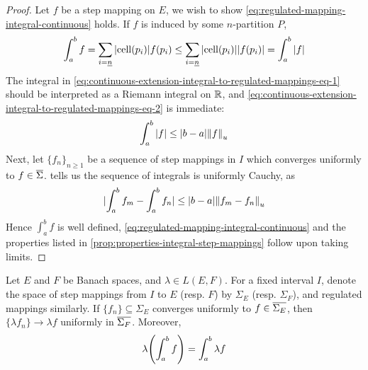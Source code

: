 \documentclass[../main-v2-manifolds.tex]{subfiles}
\begin{document}
\begin{proof}
    Let $f$ be a step mapping on $E$, we wish to show \cref{eq:regulated-mapping-integral-continuous} holds. If $f$ is induced by some $n$-partition $P$, 
    \begin{equation}\label{eq:continuous-extension-integral-to-regulated-mappings-eq-1}
    \int_a^b f = \sum_{i=\underline{n}}\vert {\operatorname{cell}(p_i)} \vert f(p_i)\leq \sum_{i=\underline{n}}\vert {\operatorname{cell}(p_i)} \vert\vert {f(p_i)} \vert = \int_a^b\vert f\vert 
    \end{equation}
    The integral in \cref{eq:continuous-extension-integral-to-regulated-mappings-eq-1} should be interpreted as a Riemann integral on $\mathbb{R}$, and \cref{eq:continuous-extension-integral-to-regulated-mappings-eq-2} is immediate:
    \begin{equation}\label{eq:continuous-extension-integral-to-regulated-mappings-eq-2}
        \int_a^b\vert f\vert \leq \vert {b-a} \vert\norm{f}_u
    \end{equation}
    Next, let $\{f_n\}_{n\geq 1}$ be a sequence of step mappings in $I$ which converges uniformly to $f\in \overline{\Sigma}$.  tells us the sequence of integrals is uniformly Cauchy, as
    \begin{equation}\label{eq:continuous-extension-integral-to-regulated-mappings-eq-3}
        \vert {\int_a^bf_m - \int_a^b f_n} \vert\leq \vert {b-a} \vert\norm{f_m - f_n}_u
    \end{equation}
    Hence $\int_a^b f$ is well defined, \cref{eq:regulated-mapping-integral-continuous} and the properties listed in \cref{prop:properties-integral-step-mappings} follow upon taking limits.
\end{proof}
\begin{wts}\label{prop:regulated-mappings-integration-clms}
    Let $E$ and $F$ be Banach spaces, and $\lambda\in L(E,F)$. For a fixed interval $I$, denote the space of step mappings from $I$ to $E$ (resp. $F$) by $\Sigma_E$ (resp. $\Sigma_F$), and regulated mappings similarly. If $\{f_n\}\subseteq \Sigma_E$ converges uniformly to $f\in \overline{\Sigma_E}$, then $\{\lambda f_n\}\to \lambda f$ uniformly in $\overline{\Sigma_F}$. Moreover,
    \begin{equation}\label{eq:regulated-mappings-integration-clms}
    \lambda\qty(\int_a^b f) = \int_a^b\lambda f
    \end{equation}
\end{wts}
\end{document}
